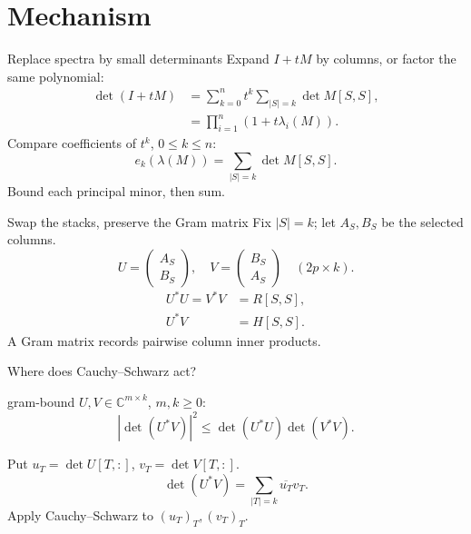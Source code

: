 \documentclass{beamer}
\begin{document}
\section{Mechanism}
\begin{frame}{Replace spectra by small determinants}
Expand $I+tM$ by columns, or factor the same polynomial:
\begin{align*}
\det(I+tM)&=\sum_{k=0}^n t^k\sum_{|S|=k}\det M[S,S],\\
&=\prod_{i=1}^n(1+t\lambda_i(M)).
\end{align*}
Compare coefficients of $t^k$, $0\leq k\leq n$:
\[
e_k(\lambda(M))=\sum_{|S|=k}\det M[S,S].
\]
\alert{Bound each principal minor, then sum.}
\end{frame}
\begin{frame}{Swap the stacks, preserve the Gram matrix}
Fix $|S|=k$; let $A_S,B_S$ be the selected columns.
\[
U=\begin{pmatrix}A_S\\B_S\end{pmatrix},\quad
V=\begin{pmatrix}B_S\\A_S\end{pmatrix}
\quad (2p\times k).
\]
\begin{align*}
U^*U=V^*V&=R[S,S],\\
U^*V&=H[S,S].
\end{align*}
A Gram matrix records pairwise column inner products.
\end{frame}
\begin{frame}{Where does Cauchy–Schwarz act?}
\begin{bookresult}{gram-bound}
$U,V\in\mathbb C^{m\times k}$, $m,k\geq0$:
\[
|\det(U^*V)|^2\leq\det(U^*U)\det(V^*V).
\]
\end{bookresult}
Put $u_T=\det U[T,:]$, $v_T=\det V[T,:]$.
\[
\det(U^*V)=\sum_{|T|=k}\overline{u_T}v_T.
\]
Apply Cauchy–Schwarz to $(u_T)_T,(v_T)_T$.
\end{frame}
\end{document}
